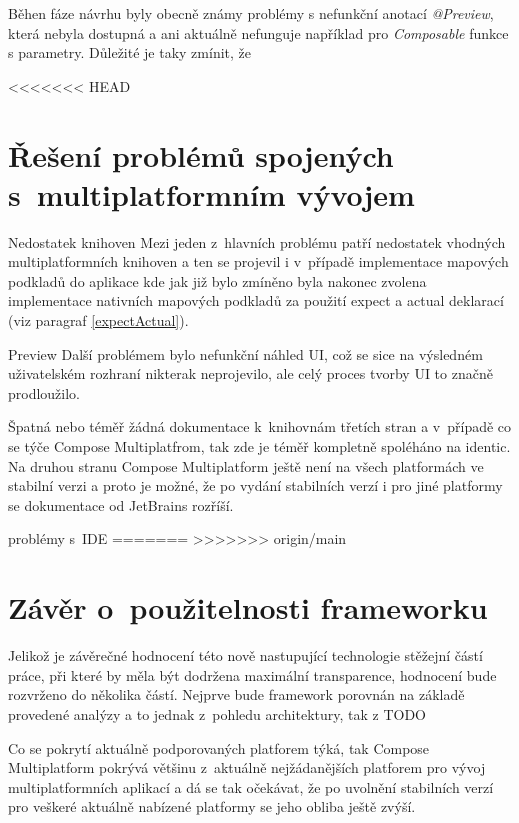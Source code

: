 Běhen fáze návrhu byly obecně známy problémy s nefunkční anotací \textit{@Preview}, která nebyla dostupná a ani aktuálně nefunguje například pro 
\textit{Composable} funkce s parametry. \cite{previewCompose} Důležité je taky zmínit, že 

<<<<<<< HEAD
\section{Řešení problémů spojených s~multiplatformním vývojem} %
Nedostatek knihoven
Mezi jeden z~hlavních problému patří nedostatek vhodných multiplatformních knihoven a ten se projevil i v~případě implementace mapových podkladů
do aplikace kde jak již bylo zmíněno byla nakonec zvolena implementace nativních mapových podkladů za použití expect a actual deklarací (viz paragraf \ref{expectActual}).

Preview
Další problémem bylo nefunkční náhled UI, což se sice na výsledném uživatelském rozhraní nikterak neprojevilo, ale celý proces tvorby UI to značně 
prodloužilo.

Špatná nebo téměř žádná dokumentace k~knihovnám třetích stran a v~případě co se týče Compose Multiplatfrom, tak zde je téměř kompletně spoléháno na
identic. 
Na druhou stranu Compose Multiplatform ještě není na všech platformách ve stabilní verzi a proto je možné, že po vydání stabilních verzí i pro jiné
platformy se dokumentace od JetBrains rozříší.

problémy s~IDE 
=======
>>>>>>> origin/main

\section{Závěr o~použitelnosti frameworku}
Jelikož je závěrečné hodnocení této nově nastupující technologie stěžejní částí práce, při které by měla být dodržena maximální 
transparence, hodnocení bude rozvrženo do několika částí. Nejprve bude framework porovnán na základě provedené analýzy a to jednak 
z~pohledu architektury, tak z TODO


Co se pokrytí aktuálně podporovaných platforem týká, tak Compose Multiplatform pokrývá většinu z~aktuálně nejžádanějších platforem pro 
vývoj multiplatformních aplikací a dá se tak očekávat, že po uvolnění stabilních verzí pro veškeré aktuálně nabízené platformy se 
jeho obliba ještě zvýší.



